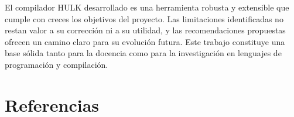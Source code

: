 \documentclass[12pt, a4paper]{article}
\begin{document}
El compilador HULK desarrollado es una herramienta robusta y extensible que cumple con creces los objetivos del proyecto. Las limitaciones identificadas no restan valor a su corrección ni a su utilidad, y las recomendaciones propuestas ofrecen un camino claro para su evolución futura. Este trabajo constituye una base sólida tanto para la docencia como para la investigación en lenguajes de programación y compilación.


\section{Referencias}
\end{document}

